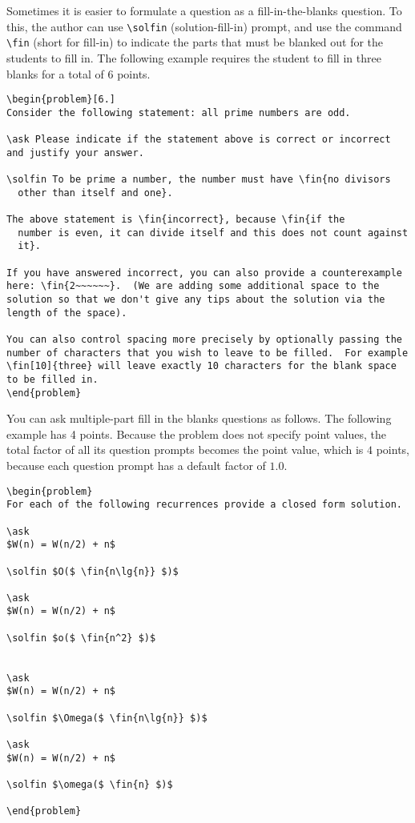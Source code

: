 \begin{example}
Sometimes it is easier to formulate a question as a fill-in-the-blanks
question.  To this, the author can use \lstinline`\solfin`
(solution-fill-in) prompt, and
%
use the command \lstinline`\fin` (short for fill-in) to indicate the
parts that must be blanked  out for  the students to fill in.
%
The following example requires the student
to fill in three blanks for a total of $6$ points.

\begin{lstlisting}
\begin{problem}[6.]
Consider the following statement: all prime numbers are odd.

\ask Please indicate if the statement above is correct or incorrect
and justify your answer.

\solfin To be prime a number, the number must have \fin{no divisors
  other than itself and one}.

The above statement is \fin{incorrect}, because \fin{if the
  number is even, it can divide itself and this does not count against
  it}.

If you have answered incorrect, you can also provide a counterexample
here: \fin{2~~~~~~}.  (We are adding some additional space to the
solution so that we don't give any tips about the solution via the
length of the space).

You can also control spacing more precisely by optionally passing the
number of characters that you wish to leave to be filled.  For example
\fin[10]{three} will leave exactly 10 characters for the blank space
to be filled in.
\end{problem}
\end{lstlisting}
\end{example}



\begin{example}
You can ask multiple-part fill in the blanks questions as follows.
The following example has 4 points.  Because the problem does not specify point values, the total factor of all its question prompts becomes the point value, which is $4$ points, because each question prompt has a default factor of $1.0$.

\begin{lstlisting}
\begin{problem}
For each of the following recurrences provide a closed form solution.

\ask 
$W(n) = W(n/2) + n$

\solfin $O($ \fin{n\lg{n}} $)$

\ask 
$W(n) = W(n/2) + n$

\solfin $o($ \fin{n^2} $)$


\ask 
$W(n) = W(n/2) + n$

\solfin $\Omega($ \fin{n\lg{n}} $)$

\ask 
$W(n) = W(n/2) + n$

\solfin $\omega($ \fin{n} $)$

\end{problem}
\end{lstlisting}
\end{example}


